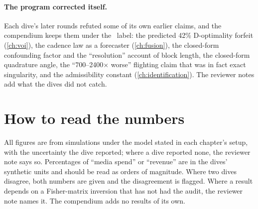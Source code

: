 \paragraph{The program corrected itself.}
Each dive's later rounds refuted some of its own earlier claims, and the compendium keeps them under the
\tagRefuted\ label: the predicted 42\% D-optimality forfeit (\cref{ch:voi}), the cadence law as a forecaster
(\cref{ch:fusion}), the closed-form confounding factor and the ``resolution'' account of block length, the
closed-form quadrature angle, the ``700--2400$\times$ worse'' flighting claim that was in fact exact
singularity, and the admissibility constant (\cref{ch:identification}). The reviewer notes add what the dives
did not catch.

\section*{How to read the numbers}

All figures are from simulations under the model stated in each chapter's setup, with the uncertainty the
dive reported; where a dive reported none, the reviewer note says so. Percentages of ``media spend'' or
``revenue'' are in the dives' synthetic units and should be read as orders of magnitude. Where two dives
disagree, both numbers are given and the disagreement is flagged. Where a result depends on a Fisher-matrix
inversion that has not had the  audit, the reviewer note names it. The compendium adds no results of
its own.
